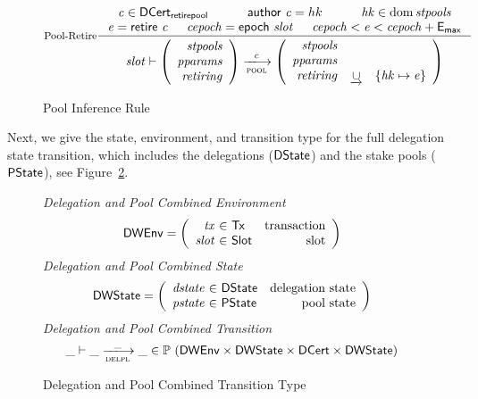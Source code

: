 \begin{figure}
  \begin{equation}\label{eq:pool-ret}
    \inference[Pool-Retire]
    {
    \var{c} \in \DCertRetirePool
    & \cauthor{c} = hk
    & \var{hk} \in \dom \var{stpools} \\
    \var{e} = \retire{c}
    & \var{cepoch} = \epoch{slot}
    & \var{cepoch} < \var{e} < \var{cepoch} + \emax
  }
  {
    \var{slot} \vdash
    \left(
      \begin{array}{r}
        \var{stpools} \\
        \var{pparams} \\
        \var{retiring}
      \end{array}
    \right)
    \trans{pool}{c}
    \left(
      \begin{array}{rcl}
        \var{stpools} \\
        \var{pparams} \\
        \var{retiring} & \unionoverrideRight & \{\var{hk} \mapsto \var{e}\} \\
      \end{array}
    \right)
  }
  \end{equation}

  \caption{Pool Inference Rule}
  \label{fig:pool-rules}

\end{figure}


Next, we give the state, environment, and transition type for the full delegation
state transition, which includes the delegations ($\mathsf{DState}$) and the stake pools
($\mathsf{PState}$), see
Figure~\ref{fig:defs:delpl}.

\begin{figure}
  \emph{Delegation and Pool Combined Environment}
  \begin{equation*}
    \DWEnv =
    \left(
      \begin{array}{r@{~\in~}lr}
        \var{tx} & \Tx & \text{transaction}\\
        \var{slot} & \Slot & \text{slot}\\
      \end{array}
    \right)
  \end{equation*}
  \emph{Delegation and Pool Combined State}
  \begin{equation*}
    \DWState =
    \left(
      \begin{array}{r@{~\in~}lr}
        \var{dstate} & \DState & \text{delegation state}\\
        \var{pstate} & \PState & \text{pool state}\\
      \end{array}
    \right)
  \end{equation*}
  \emph{Delegation and Pool Combined Transition}
  \begin{equation*}
    \_ \vdash \_ \trans{delpl}{\_} \_ \in
      \powerset (
        \DWEnv \times \DWState \times \DCert \times \DWState)
  \end{equation*}
  \caption{Delegation and Pool Combined Transition Type}
  \label{fig:defs:delpl}
\end{figure}


